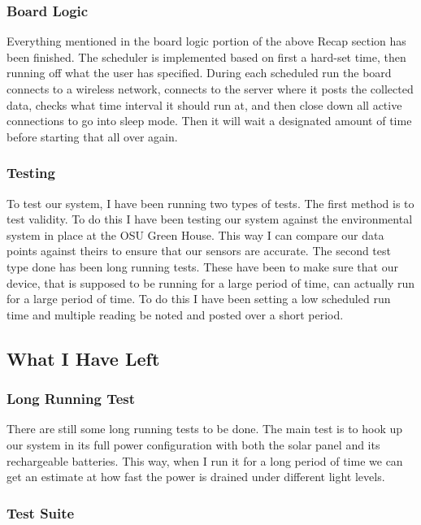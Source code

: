 \documentclass[IEEEtran,letterpaper,10pt,titlepage,fleqn,draftclsnofoot,onecolumn]{article}
\begin{document}
\subsubsection{Board Logic}

Everything mentioned in the board logic portion of the above Recap section has been finished. The scheduler is implemented based on first a hard-set time, then running off what the user has specified. During each scheduled run the board connects to a wireless network, connects to the server where it posts the collected data, checks what time interval it should run at, and then close down all active connections to go into sleep mode. Then it will wait a designated amount of time before starting that all over again.

\subsubsection{Testing}

To test our system, I have been running two types of tests. The first method is to test validity. To do this I have been testing our system against the environmental system in place at the OSU Green House. This way I can compare our data points against theirs to ensure that our sensors are accurate. The second test type done has been long running tests. These have been to make sure that our device, that is supposed to be running for a large period of time, can actually run for a large period of time. To do this I have been setting a low scheduled run time and multiple reading be noted and posted over a short period.

\subsection{What I Have Left}

\subsubsection{Long Running Test}

There are still some long running tests to be done. The main test is to hook up our system in its full power configuration with both the solar panel and its rechargeable batteries. This way, when I run it for a long period of time we can get an estimate at how fast the power is drained under different light levels.

\subsubsection{Test Suite}
\end{document}

